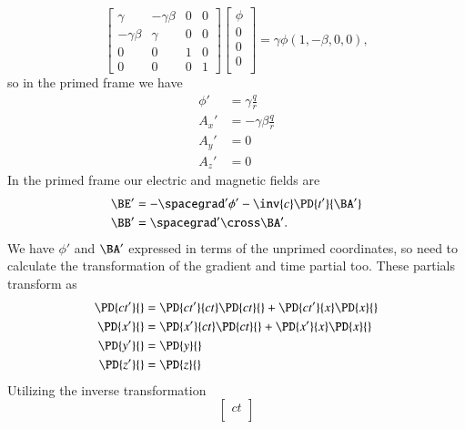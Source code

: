 {\begin{equation}
\begin{bmatrix}
\gamma & -\gamma \beta & 0 & 0 \\
-\gamma \beta & \gamma & 0 & 0 \\
0 & 0 & 1 & 0 \\
0 & 0 & 0 & 1
\end{bmatrix}
\begin{bmatrix}
\phi \\
0 \\
0 \\
0 \\
\end{bmatrix}
= \gamma \phi ( 1, -\beta, 0, 0 ),
\end{equation}
so in the primed frame we have
\begin{equation}\label{eqn:relElectroDynProblemSet2:970}
\begin{aligned}
\phi' &= \gamma \frac{q}{r} \\
A_x' &= -\gamma \beta \frac{q}{r} \\
A_y' &= 0 \\
A_z' &= 0
\end{aligned}
\end{equation}
In the primed frame our electric and magnetic fields are
%
\begin{equation}\label{eqn:relElectroDynProblemSet2:990}
\begin{aligned}
\BE' &= - \spacegrad' \phi' - \inv{c} \PD{t'}{\BA'} \\
\BB' &= \spacegrad' \cross \BA'.
\end{aligned}
\end{equation}
%
We have \(\phi'\) and \(\BA'\) expressed in terms of the unprimed coordinates, so need to calculate the transformation of the gradient and time partial too.  These partials transform as
%
\begin{equation}\label{eqn:relElectroDynProblemSet2:1010}
\begin{aligned}
\PD{c t'}{} &= \PD{ct'}{ct} \PD{ct}{} + \PD{ct'}{x} \PD{x}{} \\
\PD{x'}{} &= \PD{x'}{ct} \PD{ct}{} + \PD{x'}{x} \PD{x}{} \\
\PD{y'}{} &= \PD{y}{} \\
\PD{z'}{} &= \PD{z}{}
\end{aligned}
\end{equation}
%
Utilizing the inverse transformation
%
\begin{equation}\label{eqn:relElectroDynProblemSet2:1030}
\begin{bmatrix}
ct \\

\end{bmatrix}
\end{equation}}
